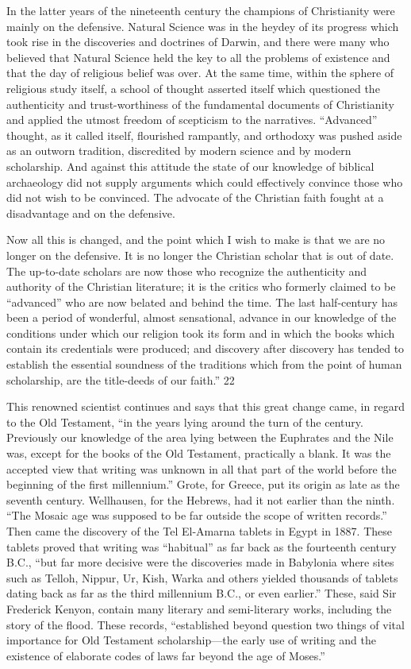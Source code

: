 In the latter years of the nineteenth century the champions of Christianity were mainly on the
defensive. Natural Science was in the heydey of its progress which took rise in the
discoveries and doctrines of Darwin, and there were many who believed that Natural Science
held the key to all the problems of existence and that the day of religious belief was over. At
the same time, within the sphere of religious study itself, a school of thought asserted itself
which questioned the authenticity and trust-worthiness of the fundamental documents of
Christianity and applied the utmost freedom of scepticism to the narratives. ``Advanced''
thought, as it called itself, flourished rampantly, and orthodoxy was pushed aside as an
outworn tradition, discredited by modern science and by modern scholarship. And against
this attitude the state of our knowledge of biblical archaeology did not supply arguments
which could effectively convince those who did not wish to be convinced. The advocate of
the Christian faith fought at a disadvantage and on the defensive.

Now all this is changed, and the point which I wish to make is that we are no longer on the
defensive. It is no longer the Christian scholar that is out of date. The up-to-date scholars are
now those who recognize the authenticity and authority of the Christian literature; it is the
critics who formerly claimed to be ``advanced'' who are now belated and behind the time. The
last half-century has been a period of wonderful, almost sensational, advance in our
knowledge of the conditions under which our religion took its form and in which the books
which contain its credentials were produced; and discovery after discovery has tended to
establish the essential soundness of the traditions which from the point of human scholarship,
are the title-deeds of our faith.'' 22

This renowned scientist continues and says that this great change came, in regard to the Old
Testament, ``in the years lying around the turn of the century. Previously our knowledge of
the area lying between the Euphrates and the Nile was, except for the books of the Old
Testament, practically a blank. It was the accepted view that writing was unknown in all that
part of the world before the beginning of the first millennium.'' Grote, for Greece, put its
origin as late as the seventh century. Wellhausen, for the Hebrews, had it not earlier than the
ninth. ``The Mosaic age was supposed to be far outside the scope of written records.'' Then
came the discovery of the Tel El-Amarna tablets in Egypt in 1887. These tablets proved that
writing was ``habitual'' as far back as the fourteenth century B.C., ``but far more decisive were
the discoveries made in Babylonia where sites such as Telloh, Nippur, Ur, Kish, Warka and
others yielded thousands of tablets dating back as far as the third millennium B.C., or even
earlier.'' These, said Sir Frederick Kenyon, contain many literary and semi-literary works,
including the story of the flood. These records, ``established beyond question two things of
vital importance for Old Testament scholarship—the early use of writing and the existence of
elaborate codes of laws far beyond the age of Moses.''

